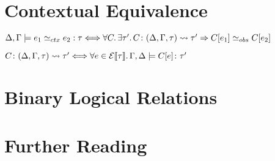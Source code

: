\section{Contextual Equivalence}

$\Delta, \Gamma \models e_1 \simeq_{ctx} e_2 : \tau \Longleftrightarrow
  \forall C \ldotp \exists \tau' \ldotp C \colon (\Delta, \Gamma, \tau) \leadsto \tau' \Rightarrow C[e_1] \simeq_{obs} C[e_2]$

$C \colon (\Delta, \Gamma, \tau) \leadsto \tau' \Longleftrightarrow
  \forall e \in \mathcal{E}\llbracket\tau\rrbracket \ldotp \Gamma,\Delta\models C[e] \colon \tau'$

\section{Binary Logical Relations}

\section{Further Reading}
